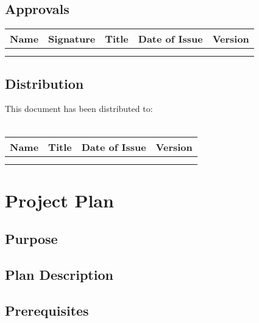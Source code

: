 \documentclass[a4paper,12pt]{article}
\begin{document}
\subsection{Approvals}


\begin{tabularx}{\textwidth}{|X|X|X|X|X|}
	
	\hline
	\textbf{Name} & 
	\textbf{Signature} & 
	\textbf{Title} & 
	\textbf{Date of Issue} &
	\textbf{Version} \\
	\hline	
		&
		& 
		&
		& 
		\\
	\hline	
		&
		& 
		&
		& 
		\\
	\hline
	
\end{tabularx}

\subsection{Distribution}

This document has been distributed to: \\
\noindent \\
\begin{tabularx}{\textwidth}{|X|X|X|X|}
	
	\hline
	\textbf{Name} &  
	\textbf{Title} & 
	\textbf{Date of Issue} &
	\textbf{Version} \\
	\hline	
	&
	&
	& 
	\\
	\hline	
	&
	&
	& 
	\\
	\hline
	
\end{tabularx}

\newpage

\tableofcontents

\newpage

\section{Project Plan}

\subsection{Purpose}

\subsection{Plan Description}

\subsection{Prerequisites}
\end{document}
